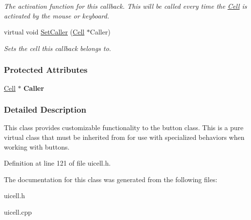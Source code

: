 \begin{DoxyCompactItemize}
\begin{DoxyCompactList}\small\item\em The activation function for this callback. This will be called every time the \hyperlink{classMezzanine_1_1UI_1_1Cell}{Cell} is activated by the mouse or keyboard. \item\end{DoxyCompactList}\item 
\hypertarget{classMezzanine_1_1UI_1_1CellCallback_a1a04d449e712481da4b91716feab98dc}{
virtual void \hyperlink{classMezzanine_1_1UI_1_1CellCallback_a1a04d449e712481da4b91716feab98dc}{SetCaller} (\hyperlink{classMezzanine_1_1UI_1_1Cell}{Cell} $\ast$Caller)}
\label{classMezzanine_1_1UI_1_1CellCallback_a1a04d449e712481da4b91716feab98dc}

\begin{DoxyCompactList}\small\item\em Sets the cell this callback belongs to. \item\end{DoxyCompactList}\end{DoxyCompactItemize}
\subsubsection*{Protected Attributes}
\begin{DoxyCompactItemize}
\item 
\hypertarget{classMezzanine_1_1UI_1_1CellCallback_ab1a0b41e337fe82ef41b237b9c591d7f}{
\hyperlink{classMezzanine_1_1UI_1_1Cell}{Cell} $\ast$ {\bfseries Caller}}
\label{classMezzanine_1_1UI_1_1CellCallback_ab1a0b41e337fe82ef41b237b9c591d7f}

\end{DoxyCompactItemize}


\subsubsection{Detailed Description}
This class provides customizable functionality to the button class. This is a pure virtual class that must be inherited from for use with specialized behaviors when working with buttons. 

Definition at line 121 of file uicell.h.



The documentation for this class was generated from the following files:\begin{DoxyCompactItemize}
\item 
uicell.h\item 
uicell.cpp\end{DoxyCompactItemize}
